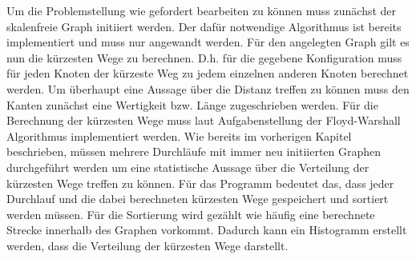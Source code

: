 \documentclass[10pt]{article}
\begin{document}
Um die Problemstellung wie gefordert bearbeiten zu können muss zunächst der skalenfreie Graph initiiert werden. Der dafür notwendige Algorithmus ist bereits implementiert und muss nur angewandt werden. Für den angelegten Graph gilt es nun die kürzesten Wege zu berechnen. D.h. für die gegebene Konfiguration muss für jeden Knoten der kürzeste Weg zu jedem einzelnen anderen Knoten berechnet werden. %
Um überhaupt eine Aussage über die Distanz treffen zu können muss den Kanten zunächst eine Wertigkeit bzw. Länge zugeschrieben werden. Für die Berechnung der kürzesten Wege muss laut Aufgabenstellung der Floyd-Warshall Algorithmus implementiert werden. 
Wie bereits im vorherigen Kapitel beschrieben, müssen mehrere Durchläufe mit immer neu initiierten Graphen durchgeführt werden um eine statistische Aussage über die Verteilung der kürzesten Wege treffen zu können. Für das Programm bedeutet das, dass jeder Durchlauf und die dabei berechneten kürzesten Wege gespeichert und sortiert werden müssen. Für die Sortierung wird gezählt wie häufig eine berechnete Strecke innerhalb des Graphen vorkommt.
Dadurch kann ein Histogramm erstellt werden, dass die Verteilung der kürzesten Wege darstellt.


\end{document}
